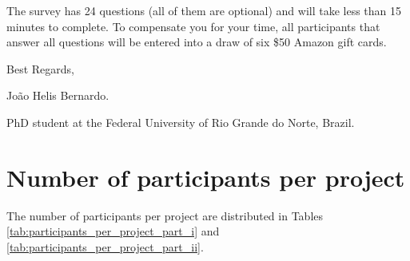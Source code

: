 \begin{appendices}
{	\noindent
	The survey has 24 questions (all of them are optional) and will take less than 15 minutes to complete. To compensate you for your time, all participants that answer all questions will be entered into a draw of six \$50 Amazon gift cards.
	\vspace{0.3cm} 
	
	\noindent
	Best Regards,
	\vspace{0.3cm} 
	
	\noindent
	Jo\~{a}o Helis Bernardo.
	
	\noindent
	PhD student at the Federal University of Rio Grande do Norte, Brazil.		
	}
	\newpage
	
	\section{Number of participants per project}
	\label{sec:appendix_participants_ids_and_their_projects}
	
	The number of participants per project are distributed in Tables \ref{tab:participants_per_project_part_i} and \ref{tab:participants_per_project_part_ii}.


\end{appendices}
